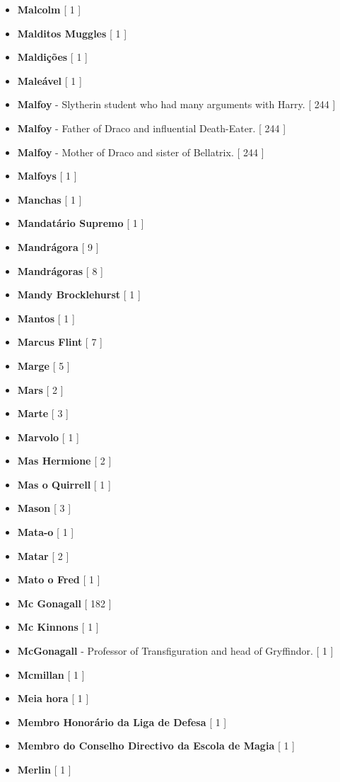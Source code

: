 \documentclass[a4paper]{article}
\begin{document}
{\begin{itemize}
	\item \textbf{Malcolm} [ 1 ]
	\item \textbf{Malditos Muggles} [ 1 ]
	\item \textbf{Maldições} [ 1 ]
	\item \textbf{Maleável} [ 1 ]
	\item \textbf{Malfoy} - Slytherin student who had many arguments with Harry. [ 244 ]
	\item \textbf{Malfoy} - Father of Draco and influential Death-Eater. [ 244 ]
	\item \textbf{Malfoy} - Mother of Draco and sister of Bellatrix. [ 244 ]
	\item \textbf{Malfoys} [ 1 ]
	\item \textbf{Manchas} [ 1 ]
	\item \textbf{Mandatário Supremo} [ 1 ]
	\item \textbf{Mandrágora} [ 9 ]
	\item \textbf{Mandrágoras} [ 8 ]
	\item \textbf{Mandy Brocklehurst} [ 1 ]
	\item \textbf{Mantos} [ 1 ]
	\item \textbf{Marcus Flint} [ 7 ]
	\item \textbf{Marge} [ 5 ]
	\item \textbf{Mars} [ 2 ]
	\item \textbf{Marte} [ 3 ]
	\item \textbf{Marvolo} [ 1 ]
	\item \textbf{Mas Hermione} [ 2 ]
	\item \textbf{Mas o Quirrell} [ 1 ]
	\item \textbf{Mason} [ 3 ]
	\item \textbf{Mata-o} [ 1 ]
	\item \textbf{Matar} [ 2 ]
	\item \textbf{Mato o Fred} [ 1 ]
	\item \textbf{Mc Gonagall} [ 182 ]
	\item \textbf{Mc Kinnons} [ 1 ]
	\item \textbf{McGonagall} - Professor of Transfiguration and head of Gryffindor. [ 1 ]
	\item \textbf{Mcmillan} [ 1 ]
	\item \textbf{Meia hora} [ 1 ]
	\item \textbf{Membro Honorário da Liga de Defesa} [ 1 ]
	\item \textbf{Membro do Conselho Directivo da Escola de Magia} [ 1 ]
	\item \textbf{Merlin} [ 1 ]

\end{itemize}}
\end{document}
